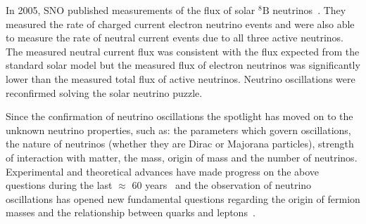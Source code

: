 In 2005, SNO published measurements of the flux of solar $^8\text{B}$
neutrinos~\cite{SNO:PhysRevC.72.055502}. They measured
the rate of charged current electron neutrino events and were also
able to measure the rate of neutral current events due to all three
active neutrinos. The measured neutral current flux was consistent
with the flux expected from the standard solar model but the measured
flux of electron neutrinos was significantly lower than the measured
total flux of active neutrinos. Neutrino oscillations were reconfirmed
solving the solar neutrino puzzle.

Since the confirmation of neutrino oscillations 
the spotlight has moved on to
the unknown neutrino properties, such as:
the parameters which govern oscillations, the nature of
neutrinos (whether they are Dirac or Majorana particles), strength of
interaction with matter, the mass, origin of mass and
the number of neutrinos. 
Experimental and theoretical advances have made progress on the above
questions during the last $\approx$ 60 years~\cite{pdg} and the
observation of neutrino oscillations has opened new fundamental
questions regarding the origin of fermion masses and the relationship
between quarks and leptons~\cite{Mohapatra:2005wg}. 








